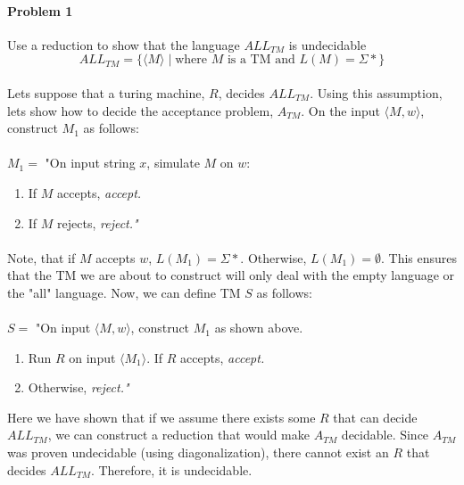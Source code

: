 \documentclass{article}
\begin{document}
\paragraph{Problem 1} Use a reduction to show that the language $ALL_{TM}$ is undecidable
\[ALL_{TM} = \{ \langle M \rangle \;|\; \mbox{where $M$ is a TM and $L(M) = \Sigma*$} \}\]

\paragraph{} Lets suppose that a turing machine, $R$, decides $ALL_{TM}$. Using this assumption, lets show how to decide the acceptance problem, $A_{TM}$.  On the input $\langle M,w\rangle$, construct $M_1$ as follows:
\\\\
\noindent $M_1 = $ "On input string $x$, simulate $M$ on $w$: 
    \begin{enumerate}[\indent 1.]
    \item If $M$ accepts, \em accept.\em
    \item If $M$ rejects, \em reject."
    \end{enumerate}
\paragraph{} Note, that if $M$ accepts $w$, $L(M_1) = \Sigma*$. Otherwise, $L(M_1) = \emptyset$. This ensures that the TM we are about to construct will only deal with the empty language or the "all" language. Now, we can define TM $S$ as follows:
\\\\
\noindent $S = $ "On input $\langle M,w\rangle$, construct $M_1$ as shown above.
	\begin{enumerate}[\indent 1.]
	\item Run $R$ on input $\langle M_1\rangle$. If $R$ accepts, \em accept.\em
	\item Otherwise, \em reject."\em\\
	\end{enumerate}
\noindent Here we have shown that if we assume there exists some $R$ that can decide $ALL_{TM}$, we can construct a reduction that would make $A_{TM}$ decidable. Since $A_{TM}$ was proven undecidable (using diagonalization), there cannot exist an $R$ that decides $ALL_{TM}$. Therefore, it is undecidable.
\end{document}
